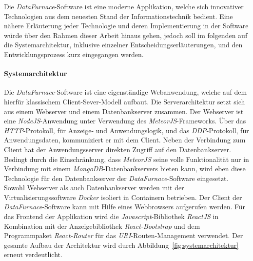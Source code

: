 \documentclass[
  language=german, %
  type=bachelor%
]{isthesis}
\begin{document}
\begin{content}
  Die \textit{DataFurnace}-Software ist eine moderne Applikation, welche sich
  innovativer Technologien aus dem neuesten Stand der Informationstechnik
  bedient. Eine nähere Erläuterung jeder Technologie und deren
  Implementierung in der Software würde über den Rahmen dieser Arbeit hinaus
  gehen, jedoch soll im folgenden auf die Systemarchitektur, inklusive
  einzelner Entscheidungserläuterungen, und den Entwicklungsprozess kurz
  eingegangen werden.


  \paragraph{Systemarchitektur}

  Die \textit{DataFurnace}-Software ist eine eigenständige  Webanwendung,
  welche auf dem hierfür klassischem Client-Sever-Modell aufbaut. Die
  Serverarchitektur setzt sich aus einem Webserver und einem Datenbankserver
  zusammen. Der Webserver ist eine \textit{NodeJS}-Anwendung unter Verwendung
  des \textit{MeteorJS}-Frameworks. Über das \textit{HTTP}-Protokoll, für
  Anzeige- und Anwendungslogik, und das \textit{DDP}-Protokoll, für
  Anwendungsdaten, kommuniziert er mit dem Client. Neben der Verbindung zum
  Client hat der Anwendungsserver direkten Zugriff auf den Datenbankserver.
  Bedingt durch die Einschränkung, dass \textit{MeteorJS} seine volle
  Funktionalität nur in Verbindung mit einem \textit{MongoDB}-Datenbankservers
  bieten kann, wird eben diese Technologie für den Datenbankserver der
  \textit{DataFurnace}-Software eingesetzt. Sowohl Webserver als auch
  Datenbankserver werden mit der Virtualisierungssoftware \textit{Docker}
  isoliert in Containern betrieben.  Der Client der
  \textit{DataFurnace}-Software kann mit Hilfe eines Webbrowsers aufgerufen
  werden. Für das Frontend der Applikation wird die
  \textit{Javascript}-Bibliothek \textit{ReactJS} in Kombination mit der
  Anzeigebibliothek \textit{React-Bootstrap} und dem Programmpaket
  \textit{React-Router} für das \textit{URI}-Routen-Management verwendet. Der
  gesamte Aufbau der Architektur wird durch
  Abbildung~\ref{fig:systemarchitektur} erneut verdeutlicht.

  \begin{figure}[caption={Systemarchitektur der \textit{DataFurnace}-Software}, label={fig:systemarchitektur}]
		\footnotesize
\end{figure}
\end{content}
\end{document}
